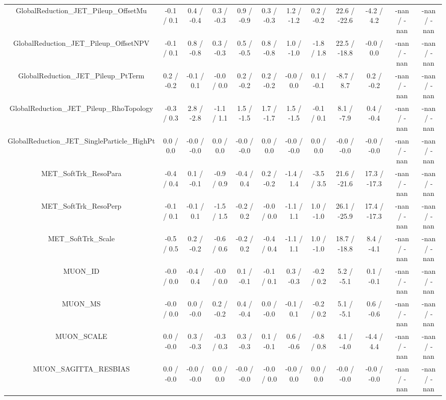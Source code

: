 \begin{table}[htbp]
\begin{center}
\begin{tabular}{|c|c|c|c|c|c|c|c|c|c|c|c|}
  GlobalReduction_JET_Pileup_OffsetMu & -0.1 / 0.1 & 0.4 / -0.4 & 0.3 / -0.3 & 0.9 / -0.9 & 0.3 / -0.3 & 1.2 / -1.2 & 0.2 / -0.2 & 22.6 / -22.6 & -4.2 / 4.2 & -nan / -nan & -nan / -nan \\ 
  GlobalReduction_JET_Pileup_OffsetNPV & -0.1 / 0.1 & 0.8 / -0.8 & 0.3 / -0.3 & 0.5 / -0.5 & 0.8 / -0.8 & 1.0 / -1.0 & -1.8 / 1.8 & 22.5 / -18.8 & -0.0 / 0.0 & -nan / -nan & -nan / -nan \\ 
  GlobalReduction_JET_Pileup_PtTerm & 0.2 / -0.2 & -0.1 / 0.1 & -0.0 / 0.0 & 0.2 / -0.2 & 0.2 / -0.2 & -0.0 / 0.0 & 0.1 / -0.1 & -8.7 / 8.7 & 0.2 / -0.2 & -nan / -nan & -nan / -nan \\ 
  GlobalReduction_JET_Pileup_RhoTopology & -0.3 / 0.3 & 2.8 / -2.8 & -1.1 / 1.1 & 1.5 / -1.5 & 1.7 / -1.7 & 1.5 / -1.5 & -0.1 / 0.1 & 8.1 / -7.9 & 0.4 / -0.4 & -nan / -nan & -nan / -nan \\ 
  GlobalReduction_JET_SingleParticle_HighPt & 0.0 / 0.0 & -0.0 / -0.0 & 0.0 / 0.0 & -0.0 / -0.0 & 0.0 / 0.0 & -0.0 / -0.0 & 0.0 / 0.0 & -0.0 / -0.0 & -0.0 / -0.0 & -nan / -nan & -nan / -nan \\ 
  MET_SoftTrk_ResoPara & -0.4 / 0.4 & 0.1 / -0.1 & -0.9 / 0.9 & -0.4 / 0.4 & 0.2 / -0.2 & -1.4 / 1.4 & -3.5 / 3.5 & 21.6 / -21.6 & 17.3 / -17.3 & -nan / -nan & -nan / -nan \\ 
  MET_SoftTrk_ResoPerp & -0.1 / 0.1 & -0.1 / 0.1 & -1.5 / 1.5 & -0.2 / 0.2 & -0.0 / 0.0 & -1.1 / 1.1 & 1.0 / -1.0 & 26.1 / -25.9 & 17.4 / -17.3 & -nan / -nan & -nan / -nan \\ 
  MET_SoftTrk_Scale & -0.5 / 0.5 & 0.2 / -0.2 & -0.6 / 0.6 & -0.2 / 0.2 & -0.4 / 0.4 & -1.1 / 1.1 & 1.0 / -1.0 & 18.7 / -18.8 & 8.4 / -4.1 & -nan / -nan & -nan / -nan \\ 
  MUON_ID & -0.0 / 0.0 & -0.4 / 0.4 & -0.0 / 0.0 & 0.1 / -0.1 & -0.1 / 0.1 & 0.3 / -0.3 & -0.2 / 0.2 & 5.2 / -5.1 & 0.1 / -0.1 & -nan / -nan & -nan / -nan \\ 
  MUON_MS & -0.0 / 0.0 & 0.0 / -0.0 & 0.2 / -0.2 & 0.4 / -0.4 & 0.0 / -0.0 & -0.1 / 0.1 & -0.2 / 0.2 & 5.1 / -5.1 & 0.6 / -0.6 & -nan / -nan & -nan / -nan \\ 
  MUON_SCALE & 0.0 / -0.0 & 0.3 / -0.3 & -0.3 / 0.3 & 0.3 / -0.3 & 0.1 / -0.1 & 0.6 / -0.6 & -0.8 / 0.8 & 4.1 / -4.0 & -4.4 / 4.4 & -nan / -nan & -nan / -nan \\ 
  MUON_SAGITTA_RESBIAS & 0.0 / -0.0 & -0.0 / -0.0 & 0.0 / 0.0 & -0.0 / -0.0 & -0.0 / 0.0 & -0.0 / 0.0 & 0.0 / 0.0 & -0.0 / -0.0 & -0.0 / -0.0 & -nan / -nan & -nan / -nan \\ 

\end{tabular}
\end{center}
\end{table}
